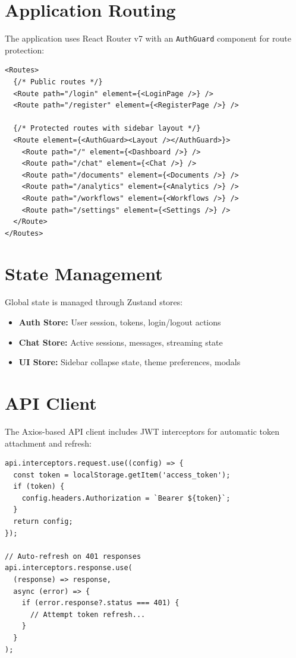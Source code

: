 \documentclass[12pt, a4paper]{report}
\begin{document}
\section{Application Routing}

The application uses React Router v7 with an \texttt{AuthGuard} component for route protection:

\begin{lstlisting}[language={}, caption={Route Configuration}]
<Routes>
  {/* Public routes */}
  <Route path="/login" element={<LoginPage />} />
  <Route path="/register" element={<RegisterPage />} />

  {/* Protected routes with sidebar layout */}
  <Route element={<AuthGuard><Layout /></AuthGuard>}>
    <Route path="/" element={<Dashboard />} />
    <Route path="/chat" element={<Chat />} />
    <Route path="/documents" element={<Documents />} />
    <Route path="/analytics" element={<Analytics />} />
    <Route path="/workflows" element={<Workflows />} />
    <Route path="/settings" element={<Settings />} />
  </Route>
</Routes>
\end{lstlisting}

\section{State Management}

Global state is managed through Zustand stores:

\begin{itemize}
    \item \textbf{Auth Store:} User session, tokens, login/logout actions
    \item \textbf{Chat Store:} Active sessions, messages, streaming state
    \item \textbf{UI Store:} Sidebar collapse state, theme preferences, modals
\end{itemize}

\section{API Client}

The Axios-based API client includes JWT interceptors for automatic token attachment and refresh:

\begin{lstlisting}[language={}, caption={API Client with JWT Interceptors}]
api.interceptors.request.use((config) => {
  const token = localStorage.getItem('access_token');
  if (token) {
    config.headers.Authorization = `Bearer ${token}`;
  }
  return config;
});

// Auto-refresh on 401 responses
api.interceptors.response.use(
  (response) => response,
  async (error) => {
    if (error.response?.status === 401) {
      // Attempt token refresh...
    }
  }
);
\end{lstlisting}
\end{document}
